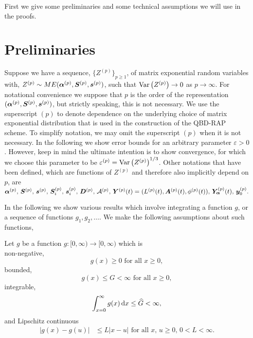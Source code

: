 First we give some preliminaries and some technical assumptions we will use in the proofs. 

\section*{Preliminaries}
Suppose we have a sequence, \(\{Z^{(p)}\}_{p\geq 1}\), of matrix exponential random variables with, \(Z^{(p)}\sim ME(\boldsymbol\alpha^{(p)},\boldsymbol S^{(p)}, \boldsymbol s^{(p)})\), such that \(\mathrm{Var}\left(Z^{(p)}\right)\to 0 \) as \(p\to \infty\). For notational convenience we suppose that \(p\) is the order of the representation \((\boldsymbol\alpha^{(p)},\boldsymbol S^{(p)}, \boldsymbol s^{(p)})\), but strictly speaking, this is not necessary. We use the superscript \((p)\) to denote dependence on the underlying choice of matrix exponential distribution that is used in the construction of the QBD-RAP scheme. To simplify notation, we may omit the superscript \((p)\) when it is not necessary. In the following we show error bounds for an arbitrary parameter \(\varepsilon>0\). However, keep in mind the ultimate intention is to show convergence, for which we choose this parameter to be \(\varepsilon^{(p)}=\mathrm{Var}\left(Z^{(p)}\right)^{1/3}\). Other notations that have been defined, which are functions of \(Z^{(p)}\) and therefore also implicitly depend on \(p\), are \(\boldsymbol\alpha^{(p)},\,\boldsymbol S^{(p)},\,\boldsymbol s^{(p)},\, \boldsymbol S_i^{(p)},\, \boldsymbol s_i^{(p)},\, \boldsymbol D^{(p)},\,\mathcal A^{(p)},\, \boldsymbol Y^{(p)}(t) = (L^{(p)}(t),\boldsymbol A^{(p)}(t), \phi^{(p)}(t)),\, \bm{Y}_{\bm{\alpha}}^{(p)}(t),\, \boldsymbol y_0^{(p)}.\)

In the following we show various results which involve integrating a function \(g\), or a sequence of functions \(g_1,g_2,\dots\). We make the following assumptions about such functions, 
\begin{asu}\label{asu: g}
	Let \(g\) be a function \(g:[0,\infty)\to [0,\infty)\) which is \\
	\subasu \label{asu: g non-neg} non-negative, 
	\[g(x) \geq 0 \mbox{ for all } x \geq 0,\]
	\subasu bounded, 
	\[g(x) \leq G < \infty \mbox{ for all } x \geq 0,\]
	\subasu integrable, 
	\[\int_{x=0}^\infty g(x)\, \mathrm{d} x \leq \widehat G < \infty,\]
	\subasu \label{asu: lipschitz} and Lipschitz continuous 
	\begin{align}
		|g(x) - g(u)|&\leq L|x - u| \mbox{ for all } x,\, u \geq 0,\, 0<L<\infty.
	\end{align}
\end{asu}

